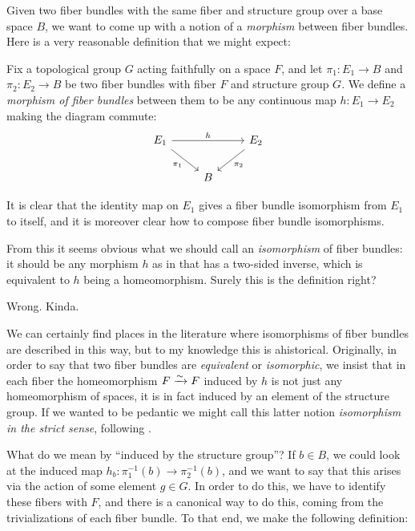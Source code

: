 \documentclass[11pt]{book}
\begin{document}
Given two fiber bundles with the same fiber and structure group over a base space $B$, we want to come up with a notion of a \emph{morphism} between fiber bundles. Here is a very reasonable definition that we might expect:

\begin{definition}\label{def:fiber-bundle-morphism} Fix a topological group $G$ acting faithfully on a space $F$, and let $\pi_1 \colon E_1 \to B$ and $\pi_2 \colon E_2 \to B$ be two fiber bundles with fiber $F$ and structure group $G$. We define a \emph{morphism of fiber bundles} between them to be any continuous map $h \colon E_1 \to E_2$ making the diagram commute:
\[ \begin{tikzcd}
    E_1\ar[rr,"h" above]\ar[dr,"\pi_1" below left]&  & E_2\ar[dl,"\pi_2" below right]\\
     & B & 
\end{tikzcd} \]
\end{definition}
It is clear that the identity map on $E_1$ gives a fiber bundle isomorphism from $E_1$ to itself, and it is moreover clear how to compose fiber bundle isomorphisms.

From this it seems obvious what we should call an \emph{isomorphism} of fiber bundles: it should be any morphism $h$ as in  that has a two-sided inverse, which is equivalent to $h$ being a homeomorphism. Surely this is the definition right?

Wrong. Kinda.

We can certainly find places in the literature where isomorphisms of fiber bundles are described in this way, but to my knowledge this is ahistorical. Originally, in order to say that two fiber bundles are \emph{equivalent} or \emph{isomorphic}, we insist that in each fiber the homeomorphism $F \xrightarrow{\sim} F$ induced by $h$ is not just any homeomorphism of spaces, it is in fact induced by an element of the structure group. If we wanted to be pedantic we might call this latter notion \emph{isomorphism in the strict sense}, following \cite[\S2.4]{Steenrod-fibre-bundles}. 

What do we mean by ``induced by the structure group''? If $b\in B$, we could look at the induced map $h_b \colon \pi_1^{-1}(b) \to \pi_2^{-1}(b)$, and we want to say that this arises via the action of some element $g\in G$. In order to do this, we have to identify these fibers with $F$, and there is a canonical way to do this, coming from the trivializations of each fiber bundle. To that end, we make the following definition:
\end{document}

